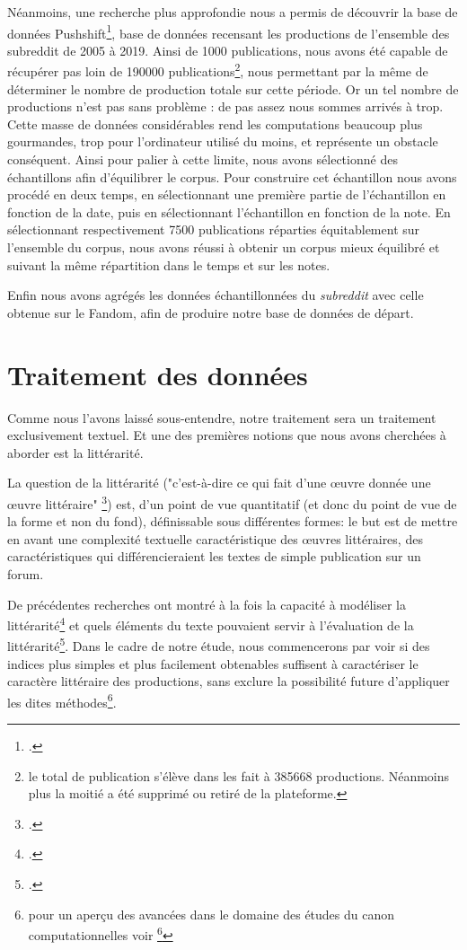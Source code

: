\documentclass[12pt,a4paper,oneside,titlepage]{book} %
\begin{document}
	Néanmoins, une recherche plus approfondie nous a permis de découvrir la base de données Pushshift\footcite{baumgartner_pushshift_2020}, base de données recensant les productions de l'ensemble des subreddit de 2005 à 2019. Ainsi de 1000 publications, nous avons été capable de récupérer pas loin de 190000 publications\footnote{le total de publication s'élève dans les fait à 385668 productions. Néanmoins plus la moitié a été supprimé ou retiré de la plateforme.}, nous permettant par la même de déterminer le nombre de production totale sur cette période. 
	Or un tel nombre de productions n'est pas sans problème : de pas assez nous sommes arrivés à trop. Cette masse de données considérables rend les computations beaucoup plus gourmandes, trop pour l'ordinateur utilisé du moins, et représente un obstacle conséquent. Ainsi pour palier à cette limite, nous avons sélectionné des échantillons afin d'équilibrer le corpus. Pour construire cet échantillon nous avons procédé en deux temps, en sélectionnant une première partie de l'échantillon en fonction de la date, puis en sélectionnant l'échantillon en fonction de la note. En sélectionnant respectivement 7500 publications réparties équitablement sur l'ensemble du corpus, nous avons réussi à obtenir un corpus mieux équilibré et suivant la même répartition dans le temps et sur les notes. 
	
	Enfin nous avons agrégés les données échantillonnées du \textit{subreddit} avec celle obtenue sur le Fandom, afin de produire notre base de données de départ.
	
	
	
	\chapter{Traitement des données}
	Comme nous l'avons laissé sous-entendre, notre traitement sera un traitement exclusivement textuel. Et une des premières notions que nous avons cherchées à aborder est la littérarité.
	
		La question de la littérarité ("c'est-à-dire ce qui fait d'une œuvre donnée une œuvre littéraire" \footcite{aron_litterature_1984}) est, d'un point de vue quantitatif (et donc du point de vue de la forme et non du fond), définissable sous différentes formes: le but est de mettre en avant une complexité textuelle caractéristique des œuvres littéraires, des caractéristiques qui différencieraient les textes de simple publication sur un forum.
		
		De précédentes recherches ont montré à la fois la capacité à modéliser la littérarité\footcite{koolen_literary_2020} et quels éléments du texte pouvaient servir à l'évaluation de la littérarité\footcite{van_cranenburgh_identifying_2015}. Dans le cadre de notre étude, nous commencerons par voir si des indices plus simples et plus facilement obtenables suffisent à caractériser le caractère littéraire des productions, sans exclure la possibilité future d'appliquer les dites méthodes\footnote{pour un aperçu des avancées dans le domaine des études du canon computationnelles voir \footcite{barre_operationalizing_2023}}.
		
\end{document}
